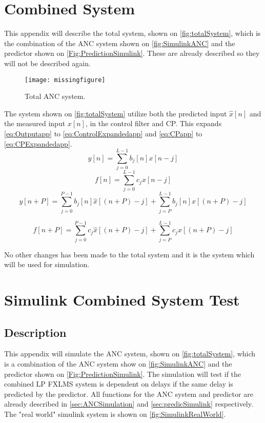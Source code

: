 \section{Combined System} \label{sec:TotalSystem}
This appendix will describe the total system, shown on \autoref{fig:totalSystem}, which is the combination of the ANC system shown on \autoref{fig:SimulinkANC} and the predictor shown on \autoref{Fig:PredictionSimulink}. These are already described so they will not be described again. 
\begin{figure}[H]
	\centering
	\texttt{[image: missingfigure]}
	\caption{Total ANC system. }
	\label{fig:totalSystem}
\end{figure}

The system shown on \autoref{fig:totalSystem} utilize both the predicted input $\hat{x}[n]$ and the measured input $x[n]$, in the control filter and CP. This expands \autoref{eq:Outputapp} to \autoref{eq:ControlExpandedapp} and \autoref{eq:CPapp} to \autoref{eq:CPExpandedapp}.
\begin{equation}\label{eq:Outputapp}
y[n]=\sum_{j=0}^{L-1}b_j[n]x[n-j]
\end{equation}
\begin{equation}\label{eq:CPapp}
f[n]=\sum_{j=0}^{L-1}c_jx[n-j]
\end{equation}
\begin{equation}\label{eq:ControlExpandedapp}
y[n+P]=\sum^{P-1}_{j=0}b_j[n]\hat{x}[(n+P)-j]+\sum^{L-1}_{j=P}b_j[n]x[(n+P)-j]
\end{equation}

\begin{equation}\label{eq:CPExpandedapp}
f[n+P]=\sum^{P-1}_{j=0}c_j\hat{x}[(n+P)-j]+\sum^{L-1}_{j=P}c_jx[(n+P)-j]
\end{equation}

No other changes has been made to the total system and it is the system which will be used for simulation.

\newpage
\section{Simulink Combined System Test} \label{sec:SimulinkTotalSystem}

\subsection{Description}
This appendix will simulate the ANC system, shown on \autoref{fig:totalSystem}, which is a combination of the ANC system show on \autoref{fig:SimulinkANC} and the predictor shown on \autoref{Fig:PredictionSimulink}. The simulation will test if the combined LP FXLMS system is dependent on delays if the same delay is predicted by the predictor. All functions for the ANC system and predictor are already described in \autoref{sec:ANCSimulation} and \autoref{sec:predicSimulink} respectively. The "real world" simulink system is shown on \autoref{fig:SimulinkRealWorld}.


